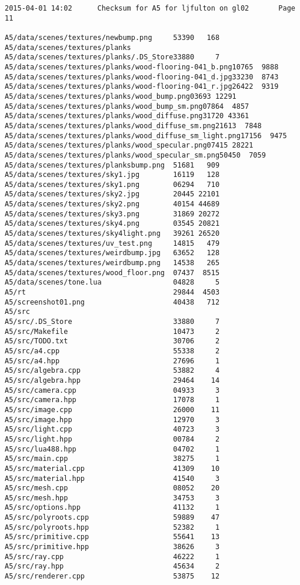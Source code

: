 \documentclass[12pt]{article}
\begin{document}
\begin{verbatim}
2015-04-01 14:02      Checksum for A5 for ljfulton on gl02       Page 11

A5/data/scenes/textures/newbump.png     53390   168
A5/data/scenes/textures/planks          
A5/data/scenes/textures/planks/.DS_Store33880     7
A5/data/scenes/textures/planks/wood-flooring-041_b.png10765  9888
A5/data/scenes/textures/planks/wood-flooring-041_d.jpg33230  8743
A5/data/scenes/textures/planks/wood-flooring-041_r.jpg26422  9319
A5/data/scenes/textures/planks/wood_bump.png03693 12291
A5/data/scenes/textures/planks/wood_bump_sm.png07864  4857
A5/data/scenes/textures/planks/wood_diffuse.png31720 43361
A5/data/scenes/textures/planks/wood_diffuse_sm.png21613  7848
A5/data/scenes/textures/planks/wood_diffuse_sm_light.png17156  9475
A5/data/scenes/textures/planks/wood_specular.png07415 28221
A5/data/scenes/textures/planks/wood_specular_sm.png50450  7059
A5/data/scenes/textures/planksbump.png  51681   909
A5/data/scenes/textures/sky1.jpg        16119   128
A5/data/scenes/textures/sky1.png        06294   710
A5/data/scenes/textures/sky2.jpg        20445 22101
A5/data/scenes/textures/sky2.png        40154 44689
A5/data/scenes/textures/sky3.png        31869 20272
A5/data/scenes/textures/sky4.png        03545 20821
A5/data/scenes/textures/sky4light.png   39261 26520
A5/data/scenes/textures/uv_test.png     14815   479
A5/data/scenes/textures/weirdbump.jpg   63652   128
A5/data/scenes/textures/weirdbump.png   14538   265
A5/data/scenes/textures/wood_floor.png  07437  8515
A5/data/scenes/tone.lua                 04828     5
A5/rt                                   29844  4503
A5/screenshot01.png                     40438   712
A5/src                                  
A5/src/.DS_Store                        33880     7
A5/src/Makefile                         10473     2
A5/src/TODO.txt                         30706     2
A5/src/a4.cpp                           55338     2
A5/src/a4.hpp                           27696     1
A5/src/algebra.cpp                      53882     4
A5/src/algebra.hpp                      29464    14
A5/src/camera.cpp                       04933     3
A5/src/camera.hpp                       17078     1
A5/src/image.cpp                        26000    11
A5/src/image.hpp                        12970     3
A5/src/light.cpp                        40723     3
A5/src/light.hpp                        00784     2
A5/src/lua488.hpp                       04702     1
A5/src/main.cpp                         38275     1
A5/src/material.cpp                     41309    10
A5/src/material.hpp                     41540     3
A5/src/mesh.cpp                         08052    20
A5/src/mesh.hpp                         34753     3
A5/src/options.hpp                      41132     1
A5/src/polyroots.cpp                    59889    47
A5/src/polyroots.hpp                    52382     1
A5/src/primitive.cpp                    55641    13
A5/src/primitive.hpp                    38626     3
A5/src/ray.cpp                          46222     1
A5/src/ray.hpp                          45634     2
A5/src/renderer.cpp                     53875    12


\end{verbatim}
\end{document}
